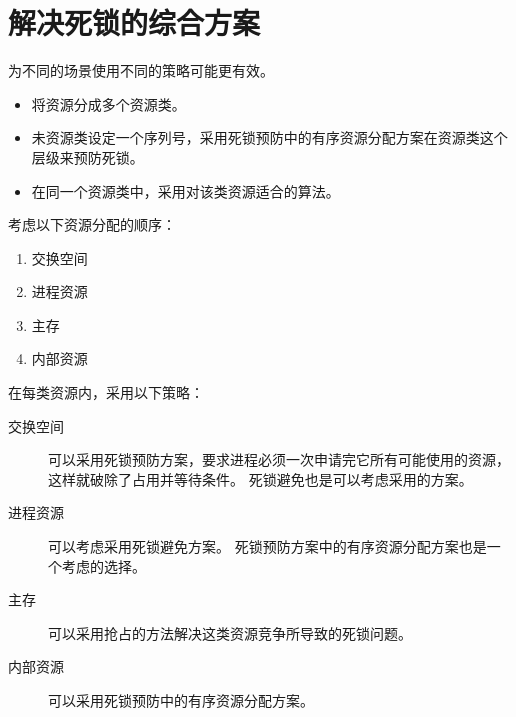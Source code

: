 
\section{解决死锁的综合方案}
{
    为不同的场景使用不同的策略可能更有效。

    \begin{itemize}
        \item 将资源分成多个资源类。
        \item 未资源类设定一个序列号，采用死锁预防中的有序资源分配方案在资源类这个层级来预防死锁。
        \item 在同一个资源类中，采用对该类资源适合的算法。
    \end{itemize}

    考虑以下资源分配的顺序：

    \begin{enumerate}
        \item 交换空间
        \item 进程资源
        \item 主存
        \item 内部资源
    \end{enumerate}

    在每类资源内，采用以下策略：

    \begin{description}
        \item[交换空间]
        {
            可以采用死锁预防方案，要求进程必须一次申请完它所有可能使用的资源，这样就破除了占用并等待条件。
            死锁避免也是可以考虑采用的方案。
        }
        \item[进程资源]
        {
            可以考虑采用死锁避免方案。
            死锁预防方案中的有序资源分配方案也是一个考虑的选择。
        }
        \item[主存] 可以采用抢占的方法解决这类资源竞争所导致的死锁问题。
        \item[内部资源] 可以采用死锁预防中的有序资源分配方案。
    \end{description}
}
